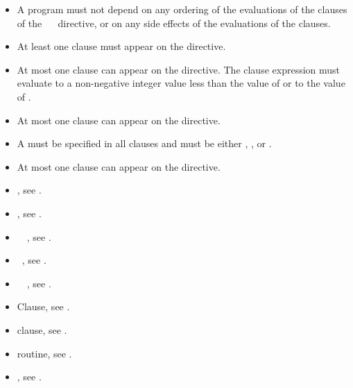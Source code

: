 \restrictions
\begin{itemize}
\item A program must not depend on any ordering of the evaluations of the clauses 
      of the ~~ directive, or on any side effects 
      of the evaluations of the clauses.
\item At least one  clause must appear on the directive.
\item At most one  clause can appear on the directive. The 
       clause expression must evaluate to a non-negative integer 
      value less than the value of  or to the 
      value of .
\item At most one  clause can appear on the directive.
\item A  must be specified in all  clauses and must be 
      either , , or .
\item At most one  clause can appear on the directive.
\end{itemize}

\crossreferences
\begin{itemize}
\item {}, see .

\item {}, see .

\item {}~~,
see .

\item {}~, see .

\item {}~~,
see .

\item {} Clause, see .

\item {} clause, see .

\item {} routine, see .

\item {}, see
.

\end{itemize}



